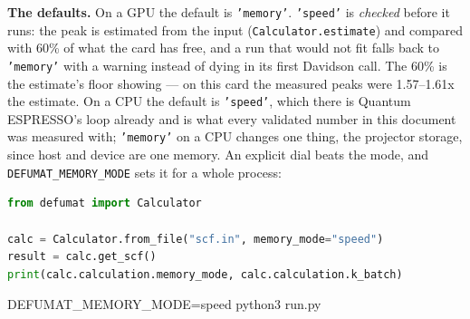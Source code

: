 \documentclass[11pt,a4paper]{article}
\newcommand{\qe}{Quantum ESPRESSO}
\newcommand{\code}[1]{\texttt{\small #1}}
\begin{document}
\textbf{The defaults.} On a GPU the default is \code{'memory'}. \code{'speed'}
is \emph{checked} before it runs: the peak is estimated from the input
(\code{Calculator.estimate}) and compared with 60\% of what the card has free,
and a run that would not fit falls back to \code{'memory'} with a warning
instead of dying in its first Davidson call. The 60\% is the estimate's floor
showing --- on this card the measured peaks were 1.57--1.61x the estimate. On a
CPU the default is \code{'speed'}, which there is \qe's loop already and is what
every validated number in this document was measured with; \code{'memory'} on a
CPU changes one thing, the projector storage, since host and device are one
memory. An explicit dial beats the mode, and \code{DEFUMAT\_MEMORY\_MODE} sets
it for a whole process:

\begin{lstlisting}[language=Python]
from defumat import Calculator

calc = Calculator.from_file("scf.in", memory_mode="speed")
result = calc.get_scf()
print(calc.calculation.memory_mode, calc.calculation.k_batch)
\end{lstlisting}

\begin{shcode}
DEFUMAT_MEMORY_MODE=speed python3 run.py
\end{shcode}
\end{document}
